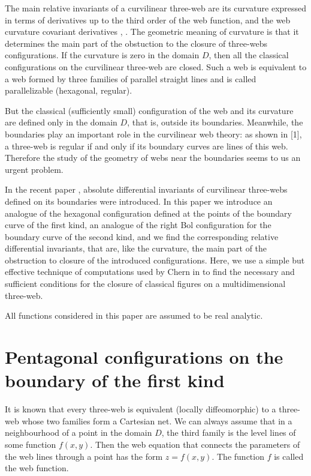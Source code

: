 \documentclass[
11pt,%
tightenlines,%
twoside,%
onecolumn,%
nofloats,%
nobibnotes,%
nofootinbib,%
superscriptaddress,%
noshowpacs,%
centertags]%
{revtex4}
\begin{document}
The main relative invariants of a curvilinear three-web are its curvature expressed in terms of derivatives up to the third order of the web function, and the web curvature covariant derivatives \cite{SLU}, \cite{B}.
The geometric meaning of curvature is that it determines the main part of the obstuction to the closure of three-webs configurations.
If the curvature is zero in the domain $D$, then all the classical configurations on the curvilinear three-web are closed. Such a web is equivalent to a web formed by three families of parallel straight lines and is called parallelizable (hexagonal, regular).

But the classical (sufficiently small) configuration of the web and its curvature are defined only in the  domain $D$, that is, outside its boundaries. Meanwhile, the boundaries play an important role in the curvilinear web theory: as shown in [1], a three-web is regular if and only if its boundary curves are lines of this web. Therefore the study of the geometry of webs near the boundaries seems to us an urgent problem.

In the recent paper \cite{AAM}, absolute differential invariants of curvilinear three-webs defined on its boundaries were introduced. In this paper we introduce an analogue of the hexagonal configuration defined at the points of the boundary curve of the first kind, an analogue of the right Bol configuration for the boundary curve of the second kind, and we find the corresponding relative differential invariants, that are, like the curvature, the main part of the obstruction to closure of the introduced configurations. Here, we use a simple but effective technique of computations used by Chern in \cite{Ch}  to find the necessary and sufficient conditions for the closure of classical figures on a multidimensional three-web.

All functions considered in this paper are assumed to be real analytic.

\section{Pentagonal configurations on the boundary of the first kind}

It is known \cite{SLU} that every three-web is equivalent (locally diffeomorphic) to a three-web whose two families form a Cartesian net.
We can always assume that in a neighbourhood of a point in the domain $D$, the third family is the level lines of some function $f(x, y)$. Then
the web equation that connects the parameters of the web lines through a point has the form
$
z=f(x, y).
$
The function $f$ is called the web function.
\end{document}
